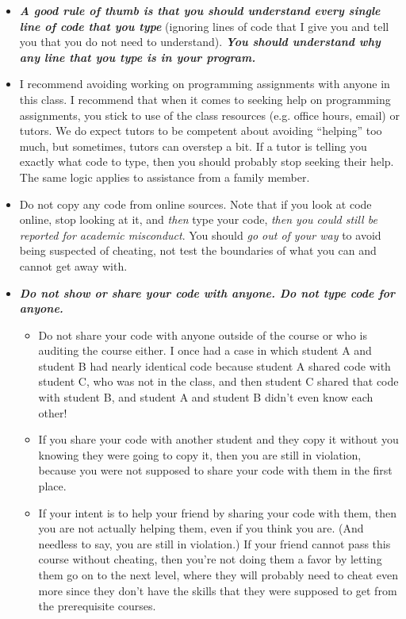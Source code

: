 \documentclass{article}
\begin{document}
\begin{itemize}[itemsep=0mm, parsep=0pt]
\item \textit{\textbf{A good rule of thumb is that  you should understand every single line of code that you type}} (ignoring lines of code that I give you and tell you that you do not need to understand). \textit{\textbf{You should understand why any line that you type is in your program.}}
\item I recommend avoiding working on programming assignments with anyone in this class. I recommend that when it comes to seeking help on programming assignments, you stick to use of the class resources (e.g. office hours, email) or tutors. We do expect tutors to be competent about avoiding ``helping'' too much, but sometimes, tutors can overstep a bit. If a tutor is telling you exactly what code to type, then you should probably stop seeking their help. The same logic applies to assistance from a family member.
\item Do not copy any code from online sources. Note that if you look at code online, stop looking at it, and \textit{then} type your code, \textit{then you could still be reported for academic misconduct}. You should \textit{go out of your way} to avoid being suspected of cheating, not test the boundaries of what you can and cannot get away with.
\item \textbf{\textit{Do not show or share your code with anyone. Do not type code for anyone.}}
    \begin{itemize}[itemsep=0mm, parsep=0pt]
    \item Do not share your code with anyone outside of the course or who is auditing the course either. I once had a case in which student A and student B had nearly identical code because student A shared code with student C, who was not in the class, and then student C shared that code with student B, and student A and student B didn't even know each other!
    \item If you share your code with another student and they copy it without you knowing they were going to copy it, then you are still in violation, because you were not supposed to share your code with them in the first place.
    \item If your intent is to help your friend by sharing your code with them, then you are not actually helping them, even if you think you are. (And needless to say, you are still in violation.) If your friend cannot pass this course without cheating, then you're not doing them a favor by letting them go on to the next level, where they will probably need to cheat even more since they don't have the skills that they were supposed to get from the prerequisite courses.

\end{itemize}
\end{itemize}
\end{document}
